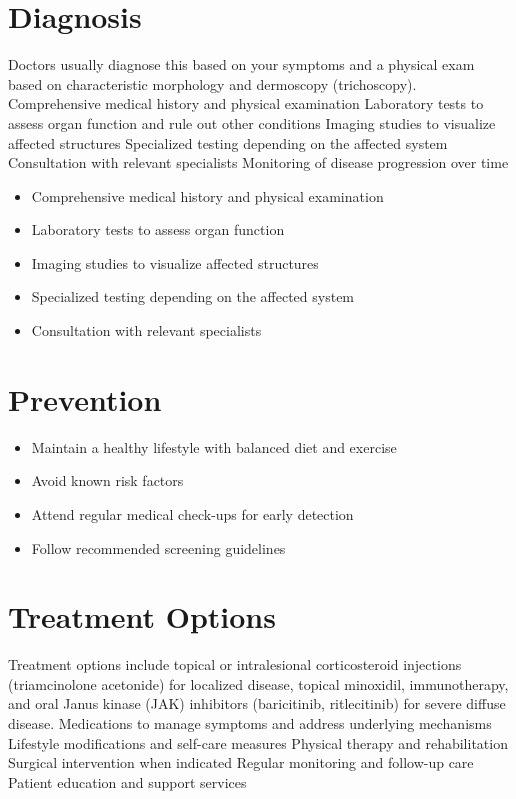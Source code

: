 \section{Diagnosis}
Doctors usually diagnose this based on your symptoms and a physical exam based on characteristic morphology and dermoscopy (trichoscopy). Comprehensive medical history and physical examination Laboratory tests to assess organ function and rule out other conditions Imaging studies to visualize affected structures Specialized testing depending on the affected system Consultation with relevant specialists Monitoring of disease progression over time

\begin{itemize}[noitemsep]
  \item Comprehensive medical history and physical examination
  \item Laboratory tests to assess organ function
  \item Imaging studies to visualize affected structures
  \item Specialized testing depending on the affected system
  \item Consultation with relevant specialists
\end{itemize}
\section{Prevention}
\begin{itemize}[noitemsep]
  \item Maintain a healthy lifestyle with balanced diet and exercise
  \item Avoid known risk factors
  \item Attend regular medical check-ups for early detection
  \item Follow recommended screening guidelines
\end{itemize}
\section{Treatment Options}
Treatment options include topical or intralesional corticosteroid injections (triamcinolone acetonide) for localized disease, topical minoxidil, immunotherapy, and oral Janus kinase (JAK) inhibitors (baricitinib, ritlecitinib) for severe diffuse disease. Medications to manage symptoms and address underlying mechanisms Lifestyle modifications and self-care measures Physical therapy and rehabilitation Surgical intervention when indicated Regular monitoring and follow-up care Patient education and support services

